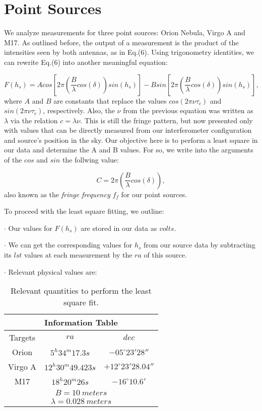 \documentclass{article}
\begin{document}
\section{Point Sources}

We analyze measurements for three point sources: Orion Nebula, Virgo A
and M17. As outlined before, the output of a measurement is the product
of the intensities seen by both antennas, as in Eq.(6). Using
trigonometry identities, we can rewrite Eq.(6) into another meaningful
equation:

\begin{equation}
F(h_{s})=Acos\left[2\pi \left(\frac{B}{\lambda}cos(\delta)\right)sin(h_{s}) \right]
- Bsin \left[2\pi \left(\frac{B}{\lambda}cos(\delta)\right)sin(h_{s})\right],
\label{meanin}
\end{equation} 
where $A$ and $B$ are constants that replace the values $cos(2\pi \nu
\tau_{c})$ and $sin(2\pi \nu \tau_{c})$, respectively. Also, the $\nu$
from the previous equation was written as $\lambda$ via the relation $c =
\lambda \nu$. This is still the
fringe pattern, but now presented only with values that can be directly
measured from our interferometer configuration and source's position in
the sky. Our objective here is to perform a least square in our data and
determine the A and B values. For so, we write into the arguments of the
$cos$ and $sin$ the follwing value:

\begin{equation}
C = 2\pi\left(\frac{B}{\lambda}cos(\delta)\right),
\label{eq:1}
\end{equation}
also known as the \emph{fringe frequency} $f_{f}$ for our point
sources. 

To proceed with the least square fitting, we outline:

$\cdot$ Our values for $F(h_{s})$ are stored in our data as $volts$.

$\cdot$ We can get the corresponding values for $h_{s}$ from our source data by
subtracting its $lst$ values at each 
measurement by the $ra$ of this
source.

$\cdot$ Relevant physical values are:

\begin{table}[H]
\center
\begin{tabular}{|c|c|c|}
\hline
\multicolumn{3}{|c|}{Information Table}\\
\hline
Targets   & $ra$ & $dec$ \\ 
\hline
Orion & $5^{h}34^{m}17.3s$ & $-05^{\circ}23'28''$\\ 
Virgo A & $12^{h}30^{m}49.423s$ & $+12^{\circ}23'28.04''$\\ 
M17 & $18^{h}20^{m}26s$ & $-16^{\circ}10.6'$\\ 
\hline
\multicolumn{3}{|c|}{$B = 10 \ meters$}\\
\hline
\multicolumn{3}{|c|}{$\lambda = 0.028 \ meters$}\\
\hline
\end{tabular}
\caption{Relevant quantities to perform the least square fit.} 
\label{tab:1}
\end{table}
\end{document}
